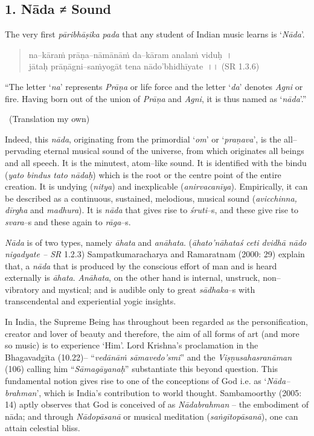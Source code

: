 \subsection*{1. Nāda ≠ Sound}

The very first \textit{pāribhāṣika pada} that any student of Indian music learns is ‘\textit{Nāda}’.

\begin{verse}
na–kāraṁ prāṇa–nāmānāṁ da–kāram analaṁ viduḥ~।\\ jātaḥ prāṇāgni–saṁyogāt tena nādo’bhidhīyate~।। (SR 1.3.6)
\end{verse}

\begin{myquote}
“The letter ‘\textit{na}’ represents \textit{Prāṇa} or life force and the letter ‘\textit{da}’ denotes \textit{Agni} or fire. Having born out of the union of \textit{Prāṇa} and \textit{Agni}, it is thus named as ‘\textit{nāda}’.” 

~\hfill (Translation my own)
\end{myquote}

Indeed, this \textit{nāda}, originating from the primordial ‘\textit{om}’ or ‘\textit{praṇava}’, is the all–pervading eternal musical sound of the universe, from which originates all beings and all speech. It is the minutest, atom–like sound\supskpt{\ref{999–aside.xhtmlid–c2–en4}}. It is identified with the bindu\supskpt{\ref{999–aside.xhtmlid–c2–en5}} (\textit{yato bindus tato nādaḥ}) which is the root or the centre point of the entire creation. It is undying (\textit{nitya})\supskpt{\ref{999–aside.xhtmlid–c2–en6}} and inexplicable (\textit{anirvacanīya}). Empirically, it can be described as a continuous, sustained, melodious, musical sound (\textit{avicchinna, dīrgha} and \textit{madhura}). It is \textit{nāda} that gives rise to \textit{śruti}–s, and these give rise to \textit{svara}–s and these again to \textit{rāga}–s.

\textit{Nāda} is of two types, namely \textit{āhata} and \textit{anāhata}. (\textit{āhato’nāhataś ceti dvidhā nādo nigadyate – SR} 1.2.3) Sampatkumaracharya and Ramaratnam (2000: 29) explain that, a \textit{nāda} that is produced by the conscious effort of man and is heard externally is \textit{āhata}. \textit{Anāhata}, on the other hand is internal, unstruck, non–vibratory and mystical; and is audible only to great \textit{sādhaka}–s with transcendental and experiential yogic insights.

In India, the Supreme Being has throughout been regarded as the personification, creator and lover of beauty and therefore, the aim of all forms of art (and more so music) is to experience ‘Him’. Lord Krishna’s proclamation in the Bhagavadgīta (10.22)– “\textit{vedānāṁ sāmavedo’smi}” and the \textit{Viṣṇusahasranāman} (106) calling him “\textit{Sāmagāyanaḥ}” substantiate this beyond question. This fundamental notion gives rise to one of the conceptions of God i.e. as ‘\textit{Nāda–brahman}’, which is India’s contribution to world thought. Sambamoorthy (2005: 14) aptly observes that God is conceived of as \textit{Nādabrahman} – the embodiment of nāda; and through \textit{Nādopāsanā} or musical meditation (\textit{saṅgītopāsanā}), one can attain celestial bliss.


